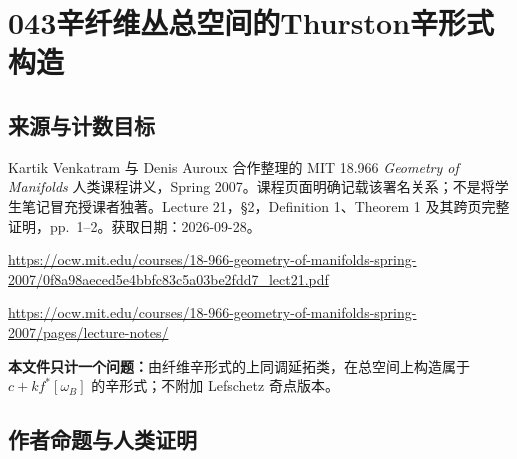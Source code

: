 \documentclass[UTF8,11pt]{ctexart}
\theoremstyle{definition}
\begin{document}
\section*{043\quad 辛纤维丛总空间的Thurston辛形式构造}
\subsection*{来源与计数目标}
Kartik Venkatram 与 Denis Auroux 合作整理的 MIT 18.966 \emph{Geometry of Manifolds} 人类课程讲义，Spring 2007。课程页面明确记载该署名关系；不是将学生笔记冒充授课者独著。Lecture 21，\S2，Definition 1、Theorem 1 及其跨页完整证明，pp.~1--2。获取日期：2026-09-28。
\par\url{https://ocw.mit.edu/courses/18-966-geometry-of-manifolds-spring-2007/0f8a98aeced5e4bbfc83c5a03be2fdd7_lect21.pdf}
\par\url{https://ocw.mit.edu/courses/18-966-geometry-of-manifolds-spring-2007/pages/lecture-notes/}
\par\textbf{本文件只计一个问题：}由纤维辛形式的上同调延拓类，在总空间上构造属于 $c+kf^*[\omega_B]$ 的辛形式；不附加 Lefschetz 奇点版本。
\subsection*{作者命题与人类证明}
\end{document}
